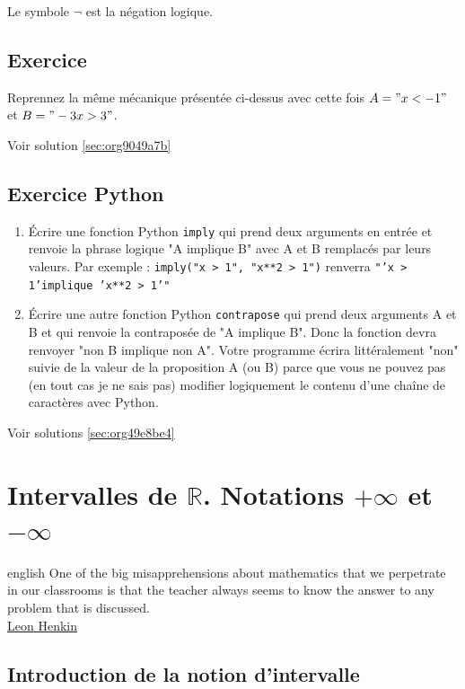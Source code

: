 \documentclass[a4paper, 11pt, twoside]{book}
\newcommand{\R}{\mathbb{R}}
\begin{document}
Le symbole \(\neg\) est la négation logique.

\section{Exercice}
\label{sec:org02c154b}
Reprennez la même mécanique présentée ci-dessus avec cette fois \(A
    = "x < -1"\) et \(B = "-3x > 3"\).

Voir solution \ref{sec:org9049a7b}

\section{Exercice Python}
\label{sec:orga38a814}
\begin{enumerate}
\item Écrire une fonction Python \texttt{imply} qui prend deux arguments en
entrée et renvoie la phrase logique "A implique B" avec A et B
remplacés par leurs valeurs.
Par exemple : \texttt{imply("x > 1", "x**2 > 1")}
renverra \texttt{"'x > 1'implique 'x**2 > 1'"}
\item Écrire une autre fonction Python \texttt{contrapose} qui prend deux
arguments A et B et qui renvoie la contraposée de "A implique
B". Donc la fonction devra renvoyer "non B implique non
A". Votre programme écrira littéralement "non" suivie de la
valeur de la proposition A (ou B) parce que vous ne pouvez pas
(en tout cas je ne sais pas) modifier logiquement le contenu
d'une chaîne de caractères avec Python.
\end{enumerate}

Voir solutions \ref{sec:org49e8be4}
\stopcontents[level-2]

\chapter{Intervalles de \(\R\). Notations \(+\infty\) et \(-\infty\)}
\label{sec:org7096b61}
\startcontents[level-2]

\begin{foreigndisplayquote}{english}
One of the big misapprehensions about mathematics that we
perpetrate in our classrooms is that the teacher always seems to
know the answer to any problem that is discussed.\\
\href{https://en.wikipedia.org/wiki/Leon\_Henkin}{Leon Henkin}
\end{foreigndisplayquote}


\section{Introduction de la notion d'intervalle}
\label{sec:org1fe44cf}
\end{document}
